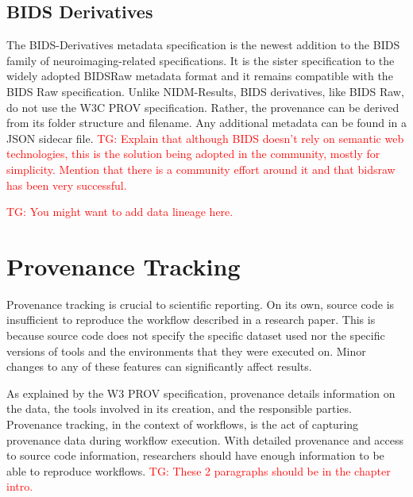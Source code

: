 \documentclass{report}
\newcommand{\tristan}[1]{\textcolor{red}{TG: #1}}
\begin{document}
            \subsection{BIDS Derivatives}
                The BIDS-Derivatives metadata specification is the newest 
                addition to the BIDS family of neuroimaging-related 
                specifications. It is the sister
                specification to the widely adopted BIDSRaw metadata format 
                and it remains compatible with the BIDS Raw specification. 
                Unlike NIDM-Results, BIDS derivatives, like BIDS Raw, do not
                use the W3C PROV specification. Rather, the provenance can be
                derived from its folder structure and filename. Any additional
                metadata can be found in a JSON sidecar file. \tristan{Explain that
                although BIDS doesn't rely on semantic web technologies, this is the
                solution being adopted in the community, mostly for simplicity. Mention
                that there is a community effort around it and that bidsraw has been
                very successful.}
            
            \tristan{You might want to add data lineage here.}

        \section{Provenance Tracking}\label{prov}
            Provenance tracking is crucial to scientific reporting.
            On its own, source code is insufficient to reproduce the workflow 
            described in a research paper. This is because source code does 
            not specify the specific dataset used nor the specific versions of
            tools and the environments that they were executed on. Minor 
            changes to any of these features can significantly affect results.

            As explained by the W3 PROV specification, provenance details 
            information on the data, the tools involved in its creation, and 
            the responsible parties. Provenance tracking, in the context of 
            workflows, is the act of capturing provenance data during
            workflow execution. With detailed provenance and access to source 
            code information, researchers should have enough information to be 
            able to reproduce workflows. \tristan{These 2 paragraphs should be in the chapter intro.}
\end{document}
